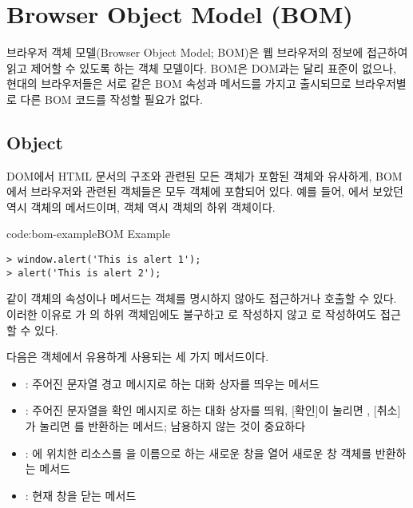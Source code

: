 \section{Browser Object Model (BOM)}\label{sect:browser-object-model}

브라우저 객체 모델(Browser Object Model; BOM)은 웹 브라우저의 정보에 접근하여 읽고 제어할 수 있도록 하는 객체 모델이다. BOM은 DOM과는 달리 표준이 없으나, 현대의 브라우저들은 서로 같은 BOM 속성과 메서드를 가지고 출시되므로 브라우저별로 다른 BOM 코드를 작성할 필요가 없다.

\subsection*{ Object}

DOM에서 HTML 문서의 구조와 관련된 모든 객체가 포함된  객체와 유사하게, BOM에서 브라우저와 관련된 객체들은 모두  객체에 포함되어 있다. 예를 들어, 에서 보았던  역시  객체의 메서드이며,  객체 역시  객체의 하위 객체이다.

\begin{codeenv}{code:bom-example}{BOM Example}\begin{verbatim}
> window.alert('This is alert 1');
> alert('This is alert 2');
\end{verbatim}
\end{codeenv}

\과 같이  객체의 속성이나 메서드는  객체를 명시하지 않아도 접근하거나 호출할 수 있다. 이러한 이유로 가 의 하위 객체임에도 불구하고 로 작성하지 않고 로 작성하여도 접근할 수 있다.

다음은  객체에서 유용하게 사용되는 세 가지 메서드이다.

\begin{itemize}
    \item {}: 주어진 문자열 경고 메시지로 하는 대화 상자를 띄우는 메서드
    \item {}: 주어진 문자열을 확인 메시지로 하는 대화 상자를 띄워, [확인]이 눌리면 , [취소]가 눌리면 를 반환하는 메서드; 남용하지 않는 것이 중요하다
    \item {}: 에 위치한 리소스를 을 이름으로 하는 새로운 창을 열어 새로운 창 객체를 반환하는 메서드
    \item {}: 현재 창을 닫는 메서드
\end{itemize}

